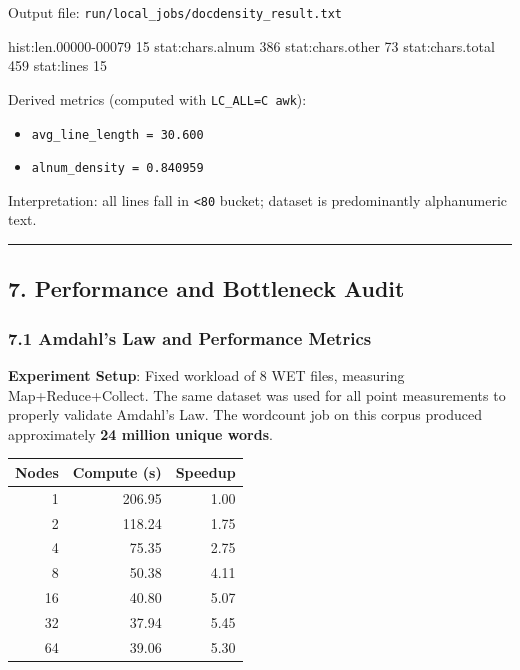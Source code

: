 \documentclass[
]{article}
\newenvironment{Shaded}{}{}
\newcommand{\NormalTok}[1]{#1}
\providecommand{\tightlist}{%
  \setlength{\itemsep}{0pt}\setlength{\parskip}{0pt}}
\begin{document}
Output file: \texttt{run/local\_jobs/docdensity\_result.txt}

\begin{Shaded}
\begin{Highlighting}[]
\NormalTok{hist:len.00000{-}00079    15}
\NormalTok{stat:chars.alnum    386}
\NormalTok{stat:chars.other    73}
\NormalTok{stat:chars.total    459}
\NormalTok{stat:lines  15}
\end{Highlighting}
\end{Shaded}

Derived metrics (computed with \texttt{LC\_ALL=C\ awk}):

\begin{itemize}
\tightlist
\item
  \texttt{avg\_line\_length\ =\ 30.600}
\item
  \texttt{alnum\_density\ =\ 0.840959}
\end{itemize}

Interpretation: all lines fall in \texttt{\textless{}80} bucket; dataset
is predominantly alphanumeric text.

\begin{center}\rule{0.5\linewidth}{0.5pt}\end{center}

\subsection{7. Performance and Bottleneck
Audit}\label{performance-and-bottleneck-audit}

\subsubsection{7.1 Amdahl's Law and Performance
Metrics}\label{amdahls-law-and-performance-metrics}

\textbf{Experiment Setup}: Fixed workload of 8 WET files, measuring
Map+Reduce+Collect. The same dataset was used for all point measurements
to properly validate Amdahl's Law. The wordcount job on this corpus
produced approximately \textbf{24 million unique words}.

\begin{center}\small
\begin{tabular}{r r r}
\toprule
\textbf{Nodes} & \textbf{Compute (s)} & \textbf{Speedup} \\
\midrule
1  & 206.95 & 1.00 \\
2  & 118.24 & 1.75 \\
4  &  75.35 & 2.75 \\
8  &  50.38 & 4.11 \\
16 &  40.80 & 5.07 \\
32 &  37.94 & 5.45 \\
64 &  39.06 & 5.30 \\
\bottomrule
\end{tabular}
\end{center}
\end{document}
